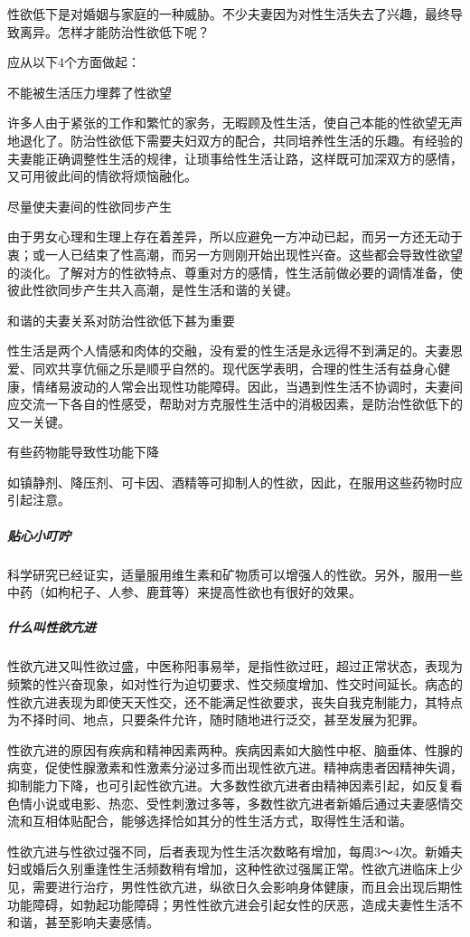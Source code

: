 性欲低下是对婚姻与家庭的一种威胁。不少夫妻因为对性生活失去了兴趣，最终导致离异。怎样才能防治性欲低下呢？

应从以下4个方面做起：

不能被生活压力埋葬了性欲望

许多人由于紧张的工作和繁忙的家务，无暇顾及性生活，使自己本能的性欲望无声地退化了。防治性欲低下需要夫妇双方的配合，共同培养性生活的乐趣。有经验的夫妻能正确调整性生活的规律，让琐事给性生活让路，这样既可加深双方的感情，又可用彼此间的情欲将烦恼融化。

尽量使夫妻间的性欲同步产生

由于男女心理和生理上存在着差异，所以应避免一方冲动已起，而另一方还无动于衷；或一人已结束了性高潮，而另一方则刚开始出现性兴奋。这些都会导致性欲望的淡化。了解对方的性欲特点、尊重对方的感情，性生活前做必要的调情准备，使彼此性欲同步产生共入高潮，是性生活和谐的关键。

和谐的夫妻关系对防治性欲低下甚为重要

性生活是两个人情感和肉体的交融，没有爱的性生活是永远得不到满足的。夫妻恩爱、同欢共享伉俪之乐是顺乎自然的。现代医学表明，合理的性生活有益身心健康，情绪易波动的人常会出现性功能障碍。因此，当遇到性生活不协调时，夫妻间应交流一下各自的性感受，帮助对方克服性生活中的消极因素，是防治性欲低下的又一关键。

有些药物能导致性功能下降

如镇静剂、降压剂、可卡因、酒精等可抑制人的性欲，因此，在服用这些药物时应引起注意。

\subparagraph{贴心小叮咛}

科学研究已经证实，适量服用维生素和矿物质可以增强人的性欲。另外，服用一些中药（如枸杞子、人参、鹿茸等）来提高性欲也有很好的效果。

\subparagraph{什么叫性欲亢进}

性欲亢进又叫性欲过盛，中医称阳事易举，是指性欲过旺，超过正常状态，表现为频繁的性兴奋现象，如对性行为迫切要求、性交频度增加、性交时间延长。病态的性欲亢进表现为即使天天性交，还不能满足性欲要求，丧失自我克制能力，其特点为不择时间、地点，只要条件允许，随时随地进行泛交，甚至发展为犯罪。

性欲亢进的原因有疾病和精神因素两种。疾病因素如大脑性中枢、脑垂体、性腺的病变，促使性腺激素和性激素分泌过多而出现性欲亢进。精神病患者因精神失调，抑制能力下降，也可引起性欲亢进。大多数性欲亢进者由精神因素引起，如反复看色情小说或电影、热恋、受性刺激过多等，多数性欲亢进者新婚后通过夫妻感情交流和互相体贴配合，能够选择恰如其分的性生活方式，取得性生活和谐。

性欲亢进与性欲过强不同，后者表现为性生活次数略有增加，每周3～4次。新婚夫妇或婚后久别重逢性生活频数稍有增加，这种性欲过强属正常。性欲亢进临床上少见，需要进行治疗，男性性欲亢进，纵欲日久会影响身体健康，而且会出现后期性功能障碍，如勃起功能障碍；男性性欲亢进会引起女性的厌恶，造成夫妻性生活不和谐，甚至影响夫妻感情。

